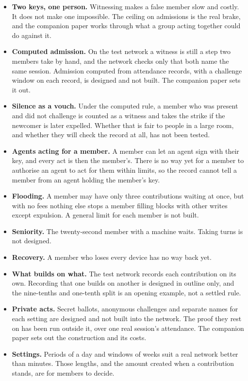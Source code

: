 \documentclass[11pt,a4paper]{article}
\begin{document}
\begin{itemize}
  \item \textbf{Two keys, one person.} Witnessing makes a false member slow and costly. It does not make one impossible. The ceiling on admissions is the real brake, and the companion paper works through what a group acting together could do against it.
  \item \textbf{Computed admission.} On the test network a witness is still a step two members take by hand, and the network checks only that both name the same session. Admission computed from attendance records, with a challenge window on each record, is designed and not built. The companion paper sets it out.
  \item \textbf{Silence as a vouch.} Under the computed rule, a member who was present and did not challenge is counted as a witness and takes the strike if the newcomer is later expelled. Whether that is fair to people in a large room, and whether they will check the record at all, has not been tested.
  \item \textbf{Agents acting for a member.} A member can let an agent sign with their key, and every act is then the member's. There is no way yet for a member to authorise an agent to act for them within limits, so the record cannot tell a member from an agent holding the member's key.
  \item \textbf{Flooding.} A member may have only three contributions waiting at once, but with no fees nothing else stops a member filling blocks with other writes except expulsion. A general limit for each member is not built.
  \item \textbf{Seniority.} The twenty-second member with a machine waits. Taking turns is not designed.
  \item \textbf{Recovery.} A member who loses every device has no way back yet.
  \item \textbf{What builds on what.} The test network records each contribution on its own. Recording that one builds on another is designed in outline only, and the nine-tenths and one-tenth split is an opening example, not a settled rule.
  \item \textbf{Private acts.} Secret ballots, anonymous challenges and separate names for each setting are designed and not built into the network. The proof they rest on has been run outside it, over one real session's attendance. The companion paper sets out the construction and its costs.
  \item \textbf{Settings.} Periods of a day and windows of weeks suit a real network better than minutes. Those lengths, and the amount created when a contribution stands, are for members to decide.
\end{itemize}
\end{document}
